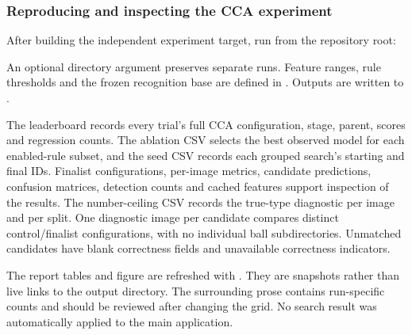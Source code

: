 \subsubsection{Reproducing and inspecting the CCA experiment}

After building the independent experiment target, run from the repository root:
\begin{quote}
\end{quote}
An optional directory argument preserves separate runs. Feature ranges, rule thresholds and the
frozen recognition base are defined in .
Outputs are written to .

The leaderboard records every trial's full CCA configuration, stage, parent,
scores and regression counts. The ablation CSV selects the best observed
model for each enabled-rule subset, and the seed CSV records each grouped
search's starting and final IDs. Finalist configurations, per-image metrics,
candidate predictions, confusion matrices, detection counts and cached
features support inspection of the results. The number-ceiling CSV records
the true-type diagnostic per image and per split. One diagnostic image per
candidate compares distinct control/finalist configurations, with no
individual ball subdirectories. Unmatched candidates have blank correctness
fields and unavailable correctness indicators.

The report tables and figure are refreshed with
. They are snapshots rather
than live links to the output directory. The surrounding prose contains
run-specific counts and should be reviewed after changing the grid. No
search result was automatically applied to the main application.
